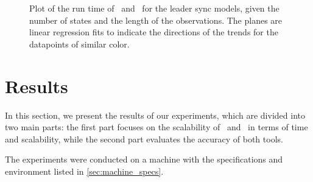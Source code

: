 \begin{figure*}
    \centering
    
    \caption{Plot of the run time of \Jajapy\ and \Cupaal\ for the leader sync models, given the number of states and the length of the observations. The planes are linear regression fits to indicate the directions of the trends for the datapoints of similar color.}
    \label{fig:leader_results}
\end{figure*}

\section{Results}\label{sec:results}
In this section, we present the results of our experiments, which are divided into two main parts: the first part focuses on the scalability of \Jajapy\ and \Cupaal\ in terms of time and scalability, while the second part evaluates the accuracy of both tools.

The experiments were conducted on a machine with the specifications and environment listed in \autoref{sec:machine_specs}.


